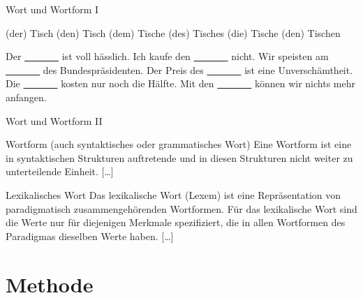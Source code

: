 \begin{frame}
  {Wort und Wortform I}
  \pause
  \begin{exe}
    \ex
    \begin{xlist}
      \ex (der) Tisch
      \pause
      \ex (den) Tisch
      \pause
      \ex (dem) Tisch\alert{e}
      \pause
      \ex (des) Tisch\alert{es}
      \pause
      \ex (die) Tisch\alert{e}
      \pause
      \ex (den) Tisch\alert{en}
    \end{xlist}
  \end{exe}
  \pause
  \begin{exe}
    \ex
    \begin{xlist}
      \ex Der \ul{\ \ \ \ \ \ \ } ist voll hässlich.
      \pause
      \ex Ich kaufe den \ul{\ \ \ \ \ \ \ } nicht.
      \pause
      \ex Wir speisten am \ul{\ \ \ \ \ \ \ } des Bundespräsidenten.
      \pause
      \ex Der Preis des \ul{\ \ \ \ \ \ \ } ist eine Unverschämtheit.
      \pause
      \ex Die \ul{\ \ \ \ \ \ \ } kosten nur noch die Hälfte.
      \pause
      \ex Mit den \ul{\ \ \ \ \ \ \ } können wir nichts mehr anfangen.
    \end{xlist}
  \end{exe}
\end{frame}

\begin{frame}
  {Wort und Wortform II}
  \pause
  \begin{block}{Wortform (auch syntaktisches oder grammatisches Wort)}
    Eine Wortform ist eine in syntaktischen Strukturen auftretende und in diesen Strukturen nicht weiter zu unterteilende Einheit.
    [\ldots]
  \end{block}
  \Zeile
  \pause
  \begin{block}{Lexikalisches Wort}
    Das \alert{lexikalische Wort} (Lexem) ist eine Repräsentation von paradigmatisch zusammengehörenden Wortformen.
    Für das lexikalische Wort sind die Werte nur für diejenigen Merkmale spezifiziert, die in allen Wortformen des Paradigmas dieselben Werte haben.
    [\ldots]
  \end{block}
\end{frame}

\section{Methode}

